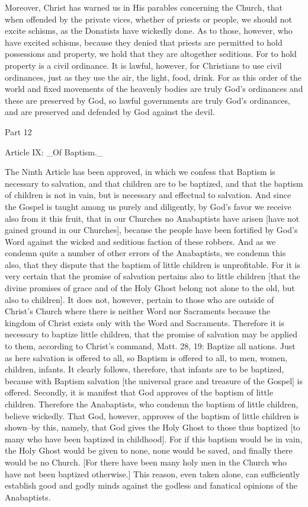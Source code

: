 Moreover, Christ has warned us in His parables concerning the Church,
that when offended by the private vices, whether of priests or people,
we should not excite schisms, as the Donatists have wickedly done.
As to those, however, who have excited schisms, because they denied
that priests are permitted to hold possessions and property, we hold
that they are altogether seditious.  For to hold property is a civil
ordinance.  It is lawful, however, for Christians to use civil
ordinances, just as they use the air, the light, food, drink.  For as
this order of the world and fixed movements of the heavenly bodies
are truly God's ordinances and these are preserved by God, so lawful
governments are truly God's ordinances, and are preserved and
defended by God against the devil.




Part 12


Article IX: _Of Baptism._

The Ninth Article has been approved, in which we confess that Baptism
is necessary to salvation, and that children are to be baptized, and
that the baptism of children is not in vain, but is necessary and
effectual to salvation.  And since the Gospel is taught among us
purely and diligently, by God's favor we receive also from it this
fruit, that in our Churches no Anabaptists have arisen [have not
gained ground in our Churches], because the people have been
fortified by God's Word against the wicked and seditious faction of
these robbers.  And as we condemn quite a number of other errors of
the Anabaptists, we condemn this also, that they dispute that the
baptism of little children is unprofitable.  For it is very certain
that the promise of salvation pertains also to little children [that
the divine promises of grace and of the Holy Ghost belong not alone
to the old, but also to children].  It does not, however, pertain to
those who are outside of Christ's Church where there is neither Word
nor Sacraments because the kingdom of Christ exists only with the
Word and Sacraments.  Therefore it is necessary to baptize little
children, that the promise of salvation may be applied to them,
according to Christ's command, Matt. 28, 19: Baptize all nations.
Just as here salvation is offered to all, so Baptism is offered to
all, to men, women, children, infants.  It clearly follows, therefore,
that infants are to be baptized, because with Baptism salvation [the
universal grace and treasure of the Gospel] is offered.  Secondly, it
is manifest that God approves of the baptism of little children.
Therefore the Anabaptists, who condemn the baptism of little children,
believe wickedly.  That God, however, approves of the baptism of
little children is shown--by this, namely, that God gives the Holy
Ghost to those thus baptized [to many who have been baptized in
childhood].  For if this baptism would be in vain, the Holy Ghost
would be given to none, none would be saved, and finally there would
be no Church.  [For there have been many holy men in the Church who
have not been baptized otherwise.] This reason, even taken alone, can
sufficiently establish good and godly minds against the godless and
fanatical opinions of the Anabaptists.




